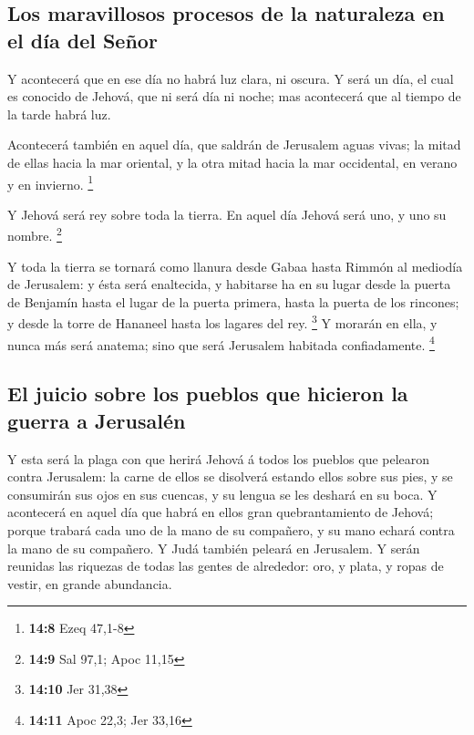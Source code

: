 \hypertarget{los-maravillosos-procesos-de-la-naturaleza-en-el-duxeda-del-seuxf1or}{%
\subsection{Los maravillosos procesos de la naturaleza en el día del
Señor}\label{los-maravillosos-procesos-de-la-naturaleza-en-el-duxeda-del-seuxf1or}}

 Y acontecerá que en ese día no habrá luz clara, ni oscura.
 Y será un día, el cual es conocido de Jehová, que ni será
día ni noche; mas acontecerá que al tiempo de la tarde habrá luz.

 Acontecerá también en aquel día, que saldrán de Jerusalem
aguas vivas; la mitad de ellas hacia la mar oriental, y la otra mitad
hacia la mar occidental, en verano y en invierno. \footnote{\textbf{14:8}
  Ezeq 47,1-8}

 Y Jehová será rey sobre toda la tierra. En aquel día Jehová
será uno, y uno su nombre. \footnote{\textbf{14:9} Sal 97,1; Apoc 11,15}

 Y toda la tierra se tornará como llanura desde Gabaa hasta
Rimmón al mediodía de Jerusalem: y ésta será enaltecida, y habitarse ha
en su lugar desde la puerta de Benjamín hasta el lugar de la puerta
primera, hasta la puerta de los rincones; y desde la torre de Hananeel
hasta los lagares del rey. \footnote{\textbf{14:10} Jer 31,38}
 Y morarán en ella, y nunca más será anatema; sino que será
Jerusalem habitada confiadamente. \footnote{\textbf{14:11} Apoc 22,3;
  Jer 33,16}

\hypertarget{el-juicio-sobre-los-pueblos-que-hicieron-la-guerra-a-jerusaluxe9n}{%
\subsection{El juicio sobre los pueblos que hicieron la guerra a
Jerusalén}\label{el-juicio-sobre-los-pueblos-que-hicieron-la-guerra-a-jerusaluxe9n}}

 Y esta será la plaga con que herirá Jehová á todos los
pueblos que pelearon contra Jerusalem: la carne de ellos se disolverá
estando ellos sobre sus pies, y se consumirán sus ojos en sus cuencas, y
su lengua se les deshará en su boca.  Y acontecerá en aquel
día que habrá en ellos gran quebrantamiento de Jehová; porque trabará
cada uno de la mano de su compañero, y su mano echará contra la mano de
su compañero.  Y Judá también peleará en Jerusalem. Y serán
reunidas las riquezas de todas las gentes de alrededor: oro, y plata, y
ropas de vestir, en grande abundancia.

